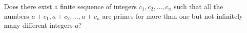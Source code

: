 Does there exist a finite sequence of integers $c_1,c_2,\ldots ,c_n$ such that all the numbers $a+c_1,a+c_2,\ldots ,a+c_n$ are primes for more than one but not infinitely many different integers $a$?